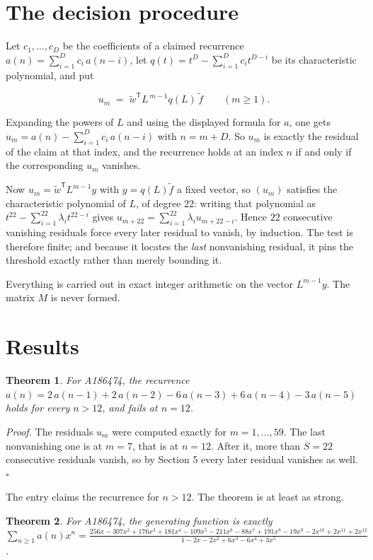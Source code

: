 \documentclass[11pt]{article}
\newtheorem{theorem}{Theorem}
\theoremstyle{definition}
\begin{document}
\section{The decision procedure}

Let $c_1,\dots,c_D$ be the coefficients of a claimed recurrence $a(n) = \sum_{i=1}^{D} c_i\,a(n-i)$, let $q(t) = t^{D} - \sum_{i=1}^{D} c_i t^{D-i}$ be its characteristic polynomial, and put

\[u_m \;=\; \tilde w^{\mathsf T} L^{\,m-1} q(L)\,\tilde f \qquad (m \ge 1).\]

Expanding the powers of $L$ and using the displayed formula for $a$, one gets $u_m = a(n) - \sum_{i=1}^{D} c_i\,a(n-i)$ with $n = m + D$. So $u_m$ is exactly the residual of the claim at that index, and the recurrence holds at an index $n$ if and only if the corresponding $u_m$ vanishes.

Now $u_m = \tilde w^{\mathsf T} L^{m-1} y$ with $y = q(L)\tilde f$ a fixed vector, so $(u_m)$ satisfies the characteristic polynomial of $L$, of degree $22$: writing that polynomial as $t^{22} - \sum_{i=1}^{22} \lambda_i t^{22-i}$ gives $u_{m+22} = \sum_{i=1}^{22} \lambda_i u_{m+22-i}$. Hence $22$ consecutive vanishing residuals force every later residual to vanish, by induction. The test is therefore finite; and because it locates the {\itshape last} nonvanishing residual, it pins the threshold exactly rather than merely bounding it.

Everything is carried out in exact integer arithmetic on the vector $L^{m-1}y$. The matrix $M$ is never formed.

\section{Results}

\begin{theorem} For A186474, the recurrence $a(n) = 2\,a(n-1) + 2\,a(n-2) - 6\,a(n-3) + 6\,a(n-4) - 3\,a(n-5)$ holds for every $n > 12$, and fails at $n = 12$.\end{theorem}

{\itshape Proof.} The residuals $u_m$ were computed exactly for $m = 1,\dots,59$. The last nonvanishing one is at $m = 7$, that is at $n = 12$. After it, more than $S = 22$ consecutive residuals vanish, so by Section 5 every later residual vanishes as well. $\square$

The entry claims the recurrence for $n > 12$. The theorem is at least as strong.

\begin{theorem} For A186474, the generating function is exactly $\sum_{n\ge 1} a(n)x^n = \frac{256x - 307x^{2} + 176x^{3} + 181x^{4} - 109x^{5} - 211x^{6} - 88x^{7} + 191x^{8} - 19x^{9} - 2x^{10} + 2x^{11} + 2x^{12}}{1 - 2x - 2x^{2} + 6x^{3} - 6x^{4} + 3x^{5}}$.\end{theorem}
\end{document}
